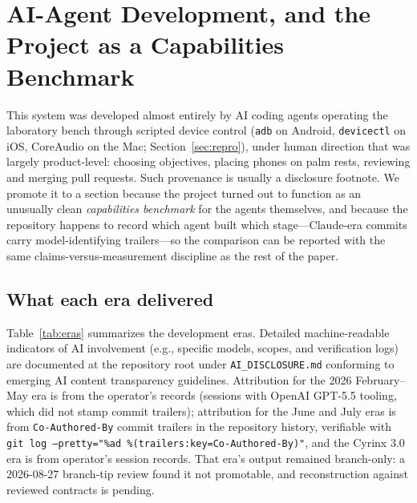 \documentclass[11pt]{article}
\begin{document}
\section{AI-Agent Development, and the Project as a Capabilities Benchmark}
\label{sec:benchmark}

This system was developed almost entirely by AI coding agents operating the
laboratory bench through scripted device control (\texttt{adb} on Android,
\texttt{devicectl} on iOS, CoreAudio on the Mac; Section~\ref{sec:repro}),
under human direction that was largely product-level: choosing objectives,
placing phones on palm rests, reviewing and merging pull requests. Such
provenance is usually a disclosure footnote. We promote it to a section
because the project turned out to function as an unusually clean
\emph{capabilities benchmark} for the agents themselves, and because the
repository happens to record which agent built which stage---Claude-era
commits carry model-identifying trailers---so the comparison can be reported
with the same claims-versus-measurement discipline as the rest of the paper.

\subsection{What each era delivered}

Table~\ref{tab:eras} summarizes the development eras. Detailed machine-readable indicators of AI involvement (e.g., specific models, scopes, and verification logs) are documented at the repository root under \texttt{AI\_DISCLOSURE.md} conforming to emerging AI content transparency guidelines. Attribution for the
2026 February--May era is from the operator's records (sessions with OpenAI
GPT-5.5 tooling, which did not stamp commit trailers); attribution for the
June and July eras is from \texttt{Co-Authored-By} commit trailers in the
repository history, verifiable with
\texttt{git log --pretty="\%ad \%(trailers:key=Co-Authored-By)"}, and the Cyrinx 3.0 era is from operator's session records. That era's output remained
branch-only: a 2026-08-27 branch-tip review found it not promotable, and
reconstruction against reviewed contracts is pending.
\end{document}
